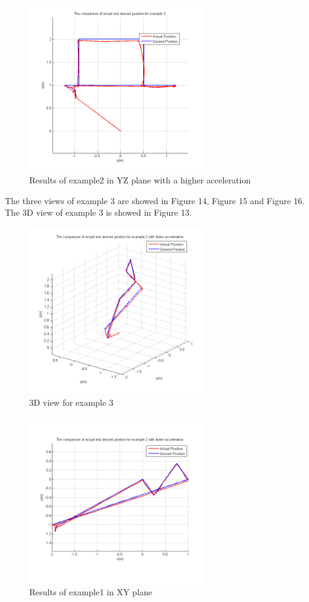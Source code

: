 \begin{figure}[H]
  \centering
  \includegraphics[width=3in]{Ex2_3_YZ.PNG}
  \caption{Results of example2 in YZ plane with a higher acceleration}
\end{figure}

The three views of example 3 are showed in Figure 14, Figure 15 and Figure 16. The 3D view of example 3 is showed in Figure 13.
\begin{figure}[H]
  \centering
  \includegraphics[width=3in]{Ex3_1_3D.png}
  \caption{3D view for example 3}
\end{figure}


\begin{figure}[H]
  \centering
  \includegraphics[width=3in]{Ex3_1_XY.PNG}
  \caption{Results of example1 in XY plane}
\end{figure}

